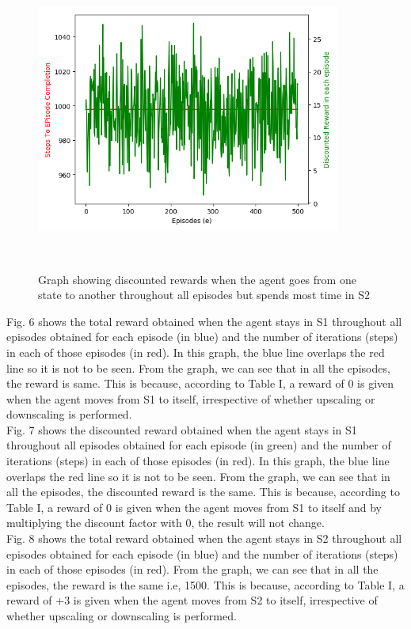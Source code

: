 \documentclass[conference]{IEEEtran}
\begin{document}
\begin{figure}[htbp]
\centerline{\includegraphics[width=10cm,height=10cm,keepaspectratio]{20-80_2.png}}
\caption{Graph showing discounted rewards when the agent goes from one state to another throughout all episodes but spends most time in S2}
\label{fig}
\end{figure}

Fig. 6 shows the total reward obtained when the agent stays in S1 throughout all episodes obtained for each episode (in blue) and the number of iterations (steps) in each of those episodes (in red). In this graph, the blue line overlaps the red line so it is not to be seen. From the graph, we can see that in all the episodes, the reward is same. This is because, according to Table I, a reward of 0 is given when the agent moves from S1 to itself, irrespective of whether upscaling or downscaling is performed. \\

Fig. 7 shows the discounted reward obtained when the agent stays in S1 throughout all episodes obtained for each episode (in green) and the number of iterations (steps) in each of those episodes (in red). In this graph, the blue line overlaps the red line so it is not to be seen. From the graph, we can see that in all the episodes, the discounted reward is the same. This is because, according to Table I, a reward of 0 is given when the agent moves from S1 to itself and by multiplying the discount factor with 0, the result will not change. \\

Fig. 8 shows the total reward obtained when the agent stays in S2 throughout all episodes obtained for each episode (in blue) and the number of iterations (steps) in each of those episodes (in red). From the graph, we can see that in all the episodes, the reward is the same i.e, 1500. This is because, according to Table I, a reward of +3 is given when the agent moves from S2 to itself, irrespective of whether upscaling or downscaling is performed. \\
\end{document}
